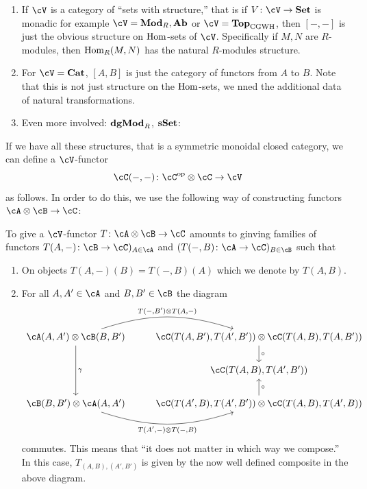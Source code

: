 \documentclass[a4paper,11pt,oneside,openany]{scrbook}
\begin{document}
\begin{exmp}
    \begin{enumerate}[label=\arabic*)]
	\item 
	   If $ \cV $ is a category of ``sets with structure,'' that is if $ V \from \cV \to \Set $ is monadic for example $ \cV = \Mod_R,\Ab $ or $ \cV = \Top_{\mathrm{CGWH}} $, then $ [-,-] $ is just the obvious structure on $ \operatorname{\text{Hom}} $-sets of $ \cV $.
	   Specifically if $ M,N $ are $ R $-modules, then $ \operatorname{\text{Hom}}_R(M,N) $ has the natural $ R $-modules structure.
       \item
	   For $ \cV = \Cat $, $ [A,B] $ is just the category of functors from $ A $ to $ B $. Note that this is not just structure on the $ \operatorname{\text{Hom}} $-sets, we nned the additional data of natural transformations.
       \item Even more involved: $ {\normalfont\textbf{dgMod}}_R$, ${\normalfont\textbf{sSet}} $: 
    \end{enumerate}
\end{exmp}
If we have all these structures, that is a symmetric monoidal closed category, we can define a $ \cV $-functor
\begin{displaymath}
    \cC(-,-) \from \cC^{\op}\otimes \cC \to \cV
\end{displaymath}
as follows.
In order to do this, we use the following way of constructing functors $ \cA\otimes \cB \to \cC $:
\begin{prop}
    To give a $ \cV $-functor $ T\from \cA \otimes \cB \to \cC $ amounts to ginving families of functors $ T(A,-)\from \cB \to \cC)_{A \in \cA} $ and $ (T(-,B) \from \cA \to \cC)_{B\in \cB} $ such that
    \begin{enumerate}[label=\roman*)]
	\item
	    On objects $ T(A,-)(B) = T(-,B)(A) $ which we denote by $ T(A,B) $.
	\item 
	    For all $ A,A' \in \cA $ and $ B,B' \in \cB $ the diagram
	    \begin{displaymath}
		\begin{tikzcd}%
		    \cA(A,A')\otimes \cB(B,B')
		    \arrow[r, "{T(-,B')\otimes T(A,-)}", bend left=18]
		    \arrow[dd, "\gamma"]
		    &
		    \cC(T(A,B') ,T(A',B')) \otimes \cC(T(A,B) ,T(A,B'))
		    \arrow[d, "\circ"]
		    \\
		    & \cC(T(A,B),T(A',B'))
		    \\
		    \cB(B,B') \otimes \cA(A,A') 
		    \arrow[r, "{T(A',-)\otimes T(-,B)}"', bend right=18]
		    & \cC(T(A',B) ,T(A',B')) \otimes \cC(T(A,B) ,T(A',B))
		    \arrow[u, "\circ"']
	        \end{tikzcd}
	    \end{displaymath}
	    commutes.
	    This means that ``it does not matter in which way we compose.''
	    In this case, $ T_{(A,B),(A',B')}  $ is given by the now well defined composite in the above diagram.
    \end{enumerate}
\end{prop}
\end{document}
